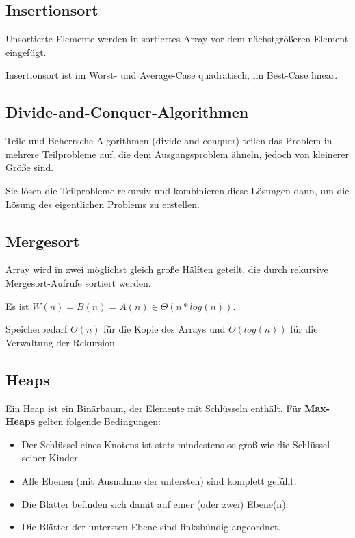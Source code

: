\documentclass[12pt]{article}
\begin{document}
\subsection{Insertionsort}

Unsortierte Elemente werden in sortiertes Array vor dem nächstgrößeren Element eingefügt.

Insertionsort ist im Worst- und Average-Case quadratisch, im Best-Case linear.

\subsection{Divide-and-Conquer-Algorithmen}

Teile-und-Beherrsche Algorithmen (divide-and-conquer) teilen das Problem in mehrere Teilprobleme auf, die dem Ausgangsproblem ähneln, jedoch von kleinerer Größe sind.

Sie lösen die Teilprobleme rekursiv und kombinieren diese Lösungen dann, um die Lösung des eigentlichen Problems zu erstellen.

\subsection{Mergesort}

Array wird in zwei möglichst gleich große Hälften geteilt, die durch rekursive Mergesort-Aufrufe sortiert werden.

Es ist $W(n) = B(n) = A(n) \in \Theta(n * log(n))$.

Speicherbedarf $\Theta(n)$ für die Kopie des Arrays und $\Theta(log(n))$ für die Verwaltung der Rekursion.

\subsection{Heaps}

Ein Heap ist ein Binärbaum, der Elemente mit Schlüsseln enthält. Für \textbf{Max-Heaps} gelten folgende Bedingungen:

\begin{itemize}  
\item Der Schlüssel eines Knotens ist stets mindestens so groß wie die Schlüssel seiner Kinder.
\item Alle Ebenen (mit Ausnahme der untersten) sind komplett gefüllt.
\item Die Blätter befinden sich damit auf einer (oder zwei) Ebene(n).
\item Die Blätter der untersten Ebene sind linksbündig angeordnet.
\end{itemize}
\end{document}
